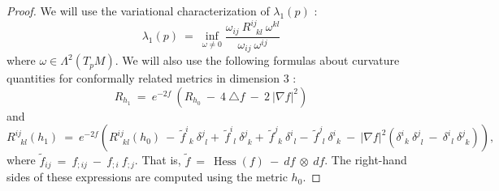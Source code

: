 \documentclass[12pt]{amsart}
\newcommand{\Hess}{\operatorname{Hess}}
\numberwithin{equation}{section}
\theoremstyle{plain}
\theoremstyle{definition}
\theoremstyle{remark}
\begin{document}
\begin{proof}
We will use the variational characterization of $\lambda_1(p)$ :
\begin{equation} \label{Rvar}
\lambda_1(p) \: = \:
\inf_{\omega \neq 0} \frac{\omega_{ij} \: R^{ij}_{\: \: \: kl} \: \omega^{kl}}{\omega_{ij} \: \omega^{ij}}
\end{equation}
where $\omega \in \Lambda^2(T_pM)$.
We will also use the following formulas about curvature quantities for
conformally related metrics in dimension $3$ :
\begin{equation} \label{confscalar}
R_{h_1} \: = \: e^{-2f} \: \left( R_{h_0} \:  - \: 4 \: \triangle f \: - \: 2 \: |\nabla f|^2 \right)
\end{equation}
and
\begin{equation} \label{confcurv}
R^{ij}_{\: \: \: kl}(h_1) \:  = \: e^{-2f} \left( R^{ij}_{\: \: \: kl}(h_0) \: - \: \widetilde{f}^i_{\: \: k} \: 
\delta^j_{\: \: l}
 + \: \widetilde{f}^i_{\: \: l} \: 
\delta^j_{\: \: k}
 + \: \widetilde{f}^j_{\: \: k} \: 
\delta^i_{\: \: l}
 - \: \widetilde{f}^j_{\: \: l} \: 
\delta^i_{\: \: k} \: - \: |\nabla f|^2 
\left( \delta^i_{\: \: k} \: \delta^j_{\: \: l} \: - \:
\delta^i_{\: \: l} \: \delta^j_{\: \: k} \right)
\right),
\end{equation}
where $\widetilde{f}_{ij} \: = \: f_{;ij} \: - \: f_{;i} \: f_{;j}$. That is,
$\widetilde{f} \: = \: \Hess(f) \: - \: df \: \otimes \: df$. The right-hand sides of these
expressions are
computed using the metric $h_0$.


\end{proof}
\end{document}

